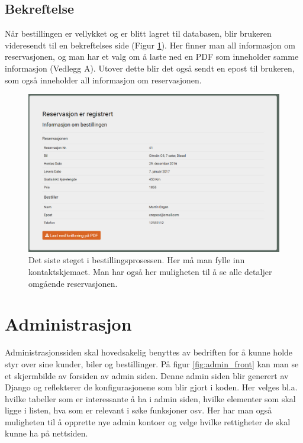 \subsection{Bekreftelse}
Når bestillingen er vellykket og er blitt lagret til databasen, blir brukeren videresendt til en bekreftelses side (Figur \ref{fig:rv_receit}). Her finner man all informasjon om reservasjonen, og man har et valg om å laste ned en PDF som inneholder samme informasjon (Vedlegg A). Utover dette blir det også sendt en epost til brukeren, som også inneholder all informasjon om reservasjonen.



 \begin{figure}[htbp]
	\centering
		\includegraphics[scale=0.5]{Bilder/rv_receipt.png}
	\caption[Ordre Bekreftelse]{Det siste steget i bestillingsprosessen. Her må man fylle inn kontaktskjemaet. Man har også her muligheten til å se alle detaljer omgående reservasjonen.} %
	\label{fig:rv_receit}
\end{figure}



\clearpage
\section{Administrasjon}
Administrasjonssiden skal hovedsakelig benyttes av bedriften for å kunne holde styr over sine kunder, biler og bestillinger. På figur \ref{fig:admin_front} kan man se et skjermbilde av forsiden av admin siden. Denne admin siden blir generert av Django og reflekterer de konfigurasjonene som blir gjort i koden. Her velges bl.a. hvilke tabeller som er interessante å ha i admin siden, hvilke elementer som skal ligge i listen, hva som er relevant i søke funksjoner osv. Her har man også muligheten til å opprette nye admin kontoer og velge hvilke rettigheter de skal kunne ha på nettsiden.\\

